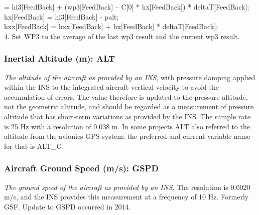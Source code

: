\documentclass[
  english,
]{book}
\begin{document}
= hi3{[}FeedBack{]} + (wp3{[}FeedBack{]} -- C{[}0{]} * hx{[}FeedBack{]})
* deltaT{[}FeedBack{]};\\
\hspace*{0.333em}\hspace*{0.333em}\hspace*{0.333em}\hspace*{0.333em}\hspace*{0.333em}hx{[}FeedBack{]}
= hi3{[}FeedBack{]} - palt;\\
\hspace*{0.333em}\hspace*{0.333em}\hspace*{0.333em}\hspace*{0.333em}\hspace*{0.333em}hxx{[}FeedBack{]}
= hxx{[}FeedBack{]} + hx{[}FeedBack{]} * deltaT{[}FeedBack{]};\\
\hspace*{0.333em}4. Set WP3 to the average of the last wp3 result and
the current wp3 result.

\hypertarget{alt}{%
\subsubsection*{Inertial Altitude (m): ALT}\label{alt}}

\emph{The altitude of the aircraft as provided by an INS}, with pressure
damping applied within the INS to the integrated aircraft vertical
velocity to avoid the accumulation of errors. The value therefore is
updated to the pressure altitude, not the geometric altitude, and should
be regarded as a measurement of pressure altitude that has short-term
variations as provided by the INS. The sample rate is 25 Hz with a
resolution of 0.038 m. In some projects ALT also referred to the
altitude from the avionics GPS system; the preferred and current
variable name for that is ALT\_G.

\hypertarget{gsf}{%
\subsubsection*{Aircraft Ground Speed (m/s): GSPD}\label{gsf}}

\emph{The ground speed of the aircraft as provided by an INS.} The
resolution is 0.0020 m/s, and the INS provides this measurement at a
frequency of 10 Hz. Formerly GSF. Update to GSPD occurred in 2014.
\end{document}
